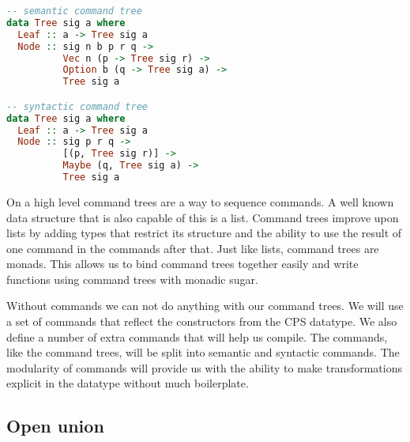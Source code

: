 \begin{lstlisting}[language=Haskell]
-- semantic command tree
data Tree sig a where
  Leaf :: a -> Tree sig a
  Node :: sig n b p r q ->
          Vec n (p -> Tree sig r) ->
          Option b (q -> Tree sig a) ->
          Tree sig a

-- syntactic command tree
data Tree sig a where
  Leaf :: a -> Tree sig a
  Node :: sig p r q ->
          [(p, Tree sig r)] ->
          Maybe (q, Tree sig a) ->
          Tree sig a
\end{lstlisting}


On a high level command trees are a way to sequence commands. A well known data structure that is also capable of this is a list. Command trees improve upon lists by adding types that restrict its structure and the ability to use the result of one command in the commands after that. Just like lists, command trees are monads. This allows us to bind command trees together easily and write functions using command trees with monadic sugar.

Without commands we can not do anything with our command trees. We will use a set of commands that reflect the constructors from the \ac{CPS} datatype. We also define a number of extra commands that will help us compile. The commands, like the command trees, will be split into semantic and syntactic commands. The modularity of commands will provide us with the ability to make transformations explicit in the datatype without much boilerplate.

\subsection{\label{section:openunion}Open union}